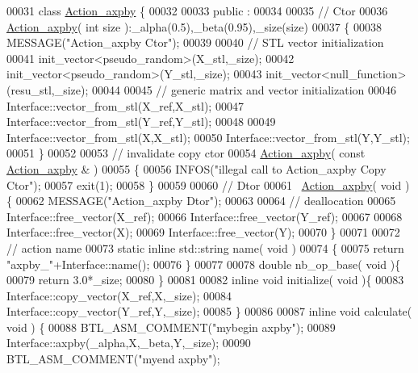 \begin{DoxyCode}
00031 \textcolor{keyword}{class }\hyperlink{class_action__axpby}{Action\_axpby} \{
00032 
00033 public :
00034 
00035   \textcolor{comment}{// Ctor}
00036   \hyperlink{class_action__axpby}{Action\_axpby}( \textcolor{keywordtype}{int} size ):\_alpha(0.5),\_beta(0.95),\_size(size)
00037   \{
00038     MESSAGE(\textcolor{stringliteral}{"Action\_axpby Ctor"});
00039 
00040     \textcolor{comment}{// STL vector initialization}
00041     init\_vector<pseudo\_random>(X\_stl,\_size);
00042     init\_vector<pseudo\_random>(Y\_stl,\_size);
00043     init\_vector<null\_function>(resu\_stl,\_size);
00044 
00045     \textcolor{comment}{// generic matrix and vector initialization}
00046     Interface::vector\_from\_stl(X\_ref,X\_stl);
00047     Interface::vector\_from\_stl(Y\_ref,Y\_stl);
00048 
00049     Interface::vector\_from\_stl(X,X\_stl);
00050     Interface::vector\_from\_stl(Y,Y\_stl);
00051   \}
00052 
00053   \textcolor{comment}{// invalidate copy ctor}
00054   \hyperlink{class_action__axpby}{Action\_axpby}( \textcolor{keyword}{const}  \hyperlink{class_action__axpby}{Action\_axpby} & )
00055   \{
00056     INFOS(\textcolor{stringliteral}{"illegal call to Action\_axpby Copy Ctor"});
00057     exit(1);
00058   \}
00059 
00060   \textcolor{comment}{// Dtor}
00061   ~\hyperlink{class_action__axpby}{Action\_axpby}( \textcolor{keywordtype}{void} )\{
00062     MESSAGE(\textcolor{stringliteral}{"Action\_axpby Dtor"});
00063 
00064     \textcolor{comment}{// deallocation}
00065     Interface::free\_vector(X\_ref);
00066     Interface::free\_vector(Y\_ref);
00067 
00068     Interface::free\_vector(X);
00069     Interface::free\_vector(Y);
00070   \}
00071 
00072   \textcolor{comment}{// action name}
00073   \textcolor{keyword}{static} \textcolor{keyword}{inline} std::string name( \textcolor{keywordtype}{void} )
00074   \{
00075     \textcolor{keywordflow}{return} \textcolor{stringliteral}{"axpby\_"}+Interface::name();
00076   \}
00077 
00078   \textcolor{keywordtype}{double} nb\_op\_base( \textcolor{keywordtype}{void} )\{
00079     \textcolor{keywordflow}{return} 3.0*\_size;
00080   \}
00081 
00082   \textcolor{keyword}{inline} \textcolor{keywordtype}{void} initialize( \textcolor{keywordtype}{void} )\{
00083     Interface::copy\_vector(X\_ref,X,\_size);
00084     Interface::copy\_vector(Y\_ref,Y,\_size);
00085   \}
00086 
00087   \textcolor{keyword}{inline} \textcolor{keywordtype}{void} calculate( \textcolor{keywordtype}{void} ) \{
00088     BTL\_ASM\_COMMENT(\textcolor{stringliteral}{"mybegin axpby"});
00089     Interface::axpby(\_alpha,X,\_beta,Y,\_size);
00090     BTL\_ASM\_COMMENT(\textcolor{stringliteral}{"myend axpby"});

\end{DoxyCode}
